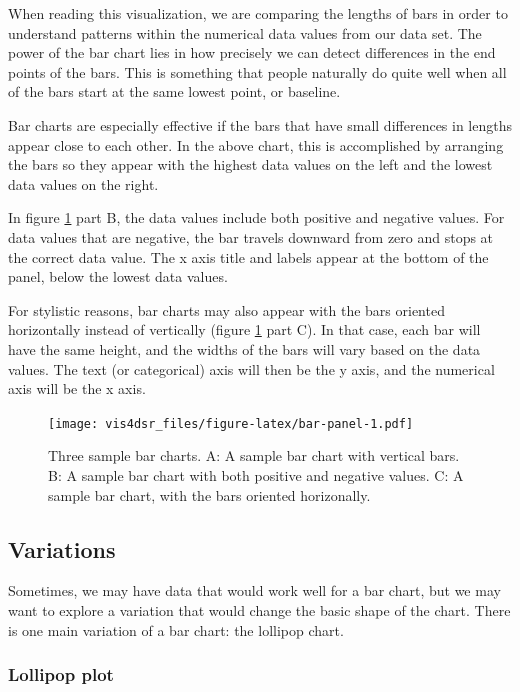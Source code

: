 \documentclass[
]{krantz}
\begin{document}
When reading this visualization, we are comparing the lengths of bars in order to
understand patterns within the numerical data values from our data set. The power
of the bar chart lies in how precisely we can detect differences in the
end points of the bars. This is something that people naturally do quite well
when all of the bars start at the same lowest point, or baseline.

Bar charts are especially effective if the bars that have small differences in
lengths appear close to each other. In the above chart, this is accomplished by
arranging the bars so they appear with the highest data values on the left and
the lowest data values on the right.

In figure \ref{fig:bar-panel} part B, the data values include both positive
and negative values. For data values that are negative, the bar travels downward
from zero and stops at the correct data value. The x axis title and labels appear
at the bottom of the panel, below the lowest data values.

For stylistic reasons, bar charts may also appear with the bars oriented horizontally
instead of vertically (figure \ref{fig:bar-panel} part C). In that case, each bar will
have the same height, and the widths of the bars will vary based on the data values.
The text (or categorical) axis will then be the y axis, and the numerical axis
will be the x axis.

\begin{figure}
\centering
\texttt{[image: vis4dsr\_files/figure-latex/bar-panel-1.pdf]}
\caption{\label{fig:bar-panel}Three sample bar charts. A: A sample bar chart with vertical bars. B: A sample bar chart with both positive and negative values. C: A sample bar chart, with the bars oriented horizonally.}
\end{figure}

\hypertarget{variations}{%
\subsection{Variations}\label{variations}}

Sometimes, we may have data that would work well for a bar chart, but we may want to
explore a variation that would change the basic shape of the chart. There is one main
variation of a bar chart: the lollipop chart.

\hypertarget{lollipop-plot}{%
\subsubsection{Lollipop plot}\label{lollipop-plot}}
\end{document}
